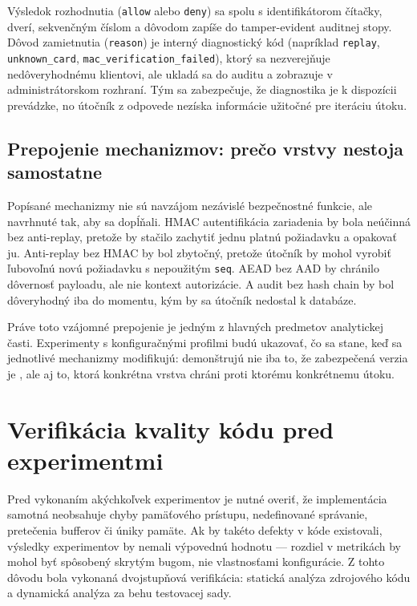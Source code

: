 \documentclass[journal,a4paper,onecolumn]{IEEEtran}
\begin{document}
Výsledok rozhodnutia (\texttt{allow} alebo \texttt{deny}) sa spolu s identifikátorom čítačky, dverí, sekvenčným číslom a dôvodom zapíše do tamper-evident auditnej stopy. Dôvod zamietnutia (\texttt{reason}) je interný diagnostický kód (napríklad \texttt{replay}, \texttt{unknown\_card}, \texttt{mac\_verification\_failed}), ktorý sa nezverejňuje nedôveryhodnému klientovi, ale ukladá sa do auditu a zobrazuje v administrátorskom rozhraní. Tým sa zabezpečuje, že diagnostika je k dispozícii prevádzke, no útočník z odpovede nezíska informácie užitočné pre iteráciu útoku.

\subsection{Prepojenie mechanizmov: prečo vrstvy nestoja samostatne}

Popísané mechanizmy nie sú navzájom nezávislé bezpečnostné funkcie, ale navrhnuté tak, aby sa dopĺňali. HMAC autentifikácia zariadenia by bola neúčinná bez anti-replay, pretože by stačilo zachytiť jednu platnú požiadavku a opakovať ju. Anti-replay bez HMAC by bol zbytočný, pretože útočník by mohol vyrobiť ľubovoľnú novú požiadavku s nepoužitým \texttt{seq}. AEAD bez AAD by chránilo dôvernosť payloadu, ale nie kontext autorizácie. A audit bez hash chain by bol dôveryhodný iba do momentu, kým by sa útočník nedostal k databáze.

Práve toto vzájomné prepojenie je jedným z hlavných predmetov analytickej časti. Experimenty s konfiguračnými profilmi budú ukazovať, čo sa stane, keď sa jednotlivé mechanizmy modifikujú: demonštrujú nie iba to, že zabezpečená verzia je , ale aj to, ktorá konkrétna vrstva chráni proti ktorému konkrétnemu útoku.

\section{Verifikácia kvality kódu pred experimentmi}

Pred vykonaním akýchkoľvek experimentov je nutné overiť, že implementácia samotná neobsahuje chyby pamäťového prístupu, nedefinované správanie, pretečenia bufferov či úniky pamäte. Ak by takéto defekty v kóde existovali, výsledky experimentov by nemali výpovednú hodnotu --- rozdiel v metrikách by mohol byť spôsobený skrytým bugom, nie vlastnosťami konfigurácie. Z tohto dôvodu bola vykonaná dvojstupňová verifikácia: statická analýza zdrojového kódu a dynamická analýza za behu testovacej sady.
\end{document}
